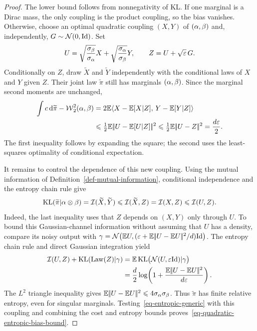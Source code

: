\begin{proof}
The lower bound follows from nonnegativity of KL. If one marginal is a Dirac mass, the only coupling is the product coupling, so the bias vanishes. Otherwise, choose an optimal quadratic coupling $(X,Y)$ of $(\alpha,\beta)$ and, independently, $G\sim\mathcal{N}(0,\mathrm{Id})$. Set
\[
    U=\sqrt{\frac{\sigma_\beta}{\sigma_\alpha}}X
       +\sqrt{\frac{\sigma_\alpha}{\sigma_\beta}}Y,
    \qquad Z=U+\sqrt{\varepsilon}\,G.
\]
Conditionally on $Z$, draw $\widetilde X$ and $\widetilde Y$ independently with the conditional laws of $X$ and $Y$ given $Z$. Their joint law $\widetilde\pi$ still has marginals $(\alpha,\beta)$. Since the marginal second moments are unchanged,
\[
    \begin{aligned}
    \int c\,\mathrm{d}\widetilde\pi-\operatorname{\mathcal{W}}_2^2(\alpha,\beta)
       &=2\mathbb{E}\langle X-\mathbb{E}[X|Z],\,Y-\mathbb{E}[Y|Z]\rangle\\
       &\leqslant\tfrac12\mathbb{E}|\!| U-\mathbb{E}[U|Z] |\!|^2
        \leqslant\tfrac12\mathbb{E}|\!| U-Z |\!|^2=\frac{d\varepsilon}{2}.
    \end{aligned}
\]
The first inequality follows by expanding the square; the second uses the least-squares optimality of conditional expectation.

It remains to control the dependence of this new coupling. Using the mutual information of Definition~\ref{def-mutual-information}, conditional independence and the entropy chain rule give
\[
    \operatorname{KL}(\widetilde\pi|\alpha\otimes\beta)
    =\mathcal{I}(\widetilde X,\widetilde Y)
    \leqslant\mathcal{I}(\widetilde X,Z)=\mathcal{I}(X,Z)\leqslant\mathcal{I}(U,Z).
\]
Indeed, the last inequality uses that $Z$ depends on $(X,Y)$ only through $U$. To bound this Gaussian-channel information without assuming that $U$ has a density, compare its noisy output with
$\gamma=\mathcal{N}\bigl(\mathbb{E} U,(\varepsilon+\mathbb{E}|\!| U-\mathbb{E} U |\!|^2/d)\mathrm{Id}\bigr)$.
The entropy chain rule and direct Gaussian integration yield
\[
    \begin{aligned}
    \mathcal{I}(U,Z)+\operatorname{KL}(\operatorname{Law}(Z)|\gamma)
       &=\mathbb{E}\operatorname{KL}\bigl(\mathcal{N}(U,\varepsilon\mathrm{Id})|\gamma\bigr)\\
       &=\frac d2\log\!\left(1+\frac{\mathbb{E}|\!| U-\mathbb{E} U |\!|^2}{d\varepsilon}\right).
    \end{aligned}
\]
The $L^2$ triangle inequality gives $\mathbb{E}|\!| U-\mathbb{E} U |\!|^2\leqslant4\sigma_\alpha\sigma_\beta$. Thus $\widetilde\pi$ has finite relative entropy, even for singular marginals. Testing~\eqref{eq-entropic-generic} with this coupling and combining the cost and entropy bounds proves~\eqref{eq-quadratic-entropic-bias-bound}.
\end{proof}

